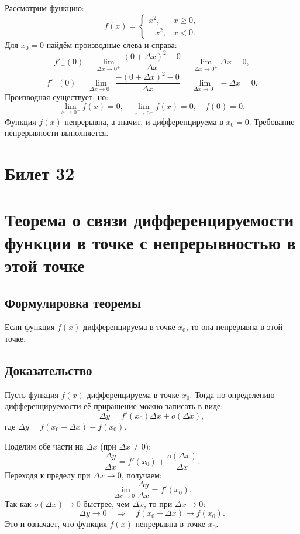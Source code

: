 \documentclass{article}
\begin{document}
Рассмотрим функцию:
\[
f(x) = 
\begin{cases} 
x^2, & x \geq 0, \\ 
-x^2, & x < 0.
\end{cases}
\]
Для \( x_0 = 0 \) найдём производные слева и справа:
\[
f'_+(0) = \lim_{\Delta x \to 0^+} \frac{(0 + \Delta x)^2 - 0}{\Delta x} = \lim_{\Delta x \to 0^+} \Delta x = 0,
\]
\[
f'_-(0) = \lim_{\Delta x \to 0^-} \frac{-(0 + \Delta x)^2 - 0}{\Delta x} = \lim_{\Delta x \to 0^-} -\Delta x = 0.
\]
Производная существует, но:
\[
\lim_{x \to 0^-} f(x) = 0, \quad \lim_{x \to 0^+} f(x) = 0, \quad f(0) = 0.
\]
Функция \( f(x) \) непрерывна, а значит, и дифференцируема в \( x_0 = 0 \). Требование непрерывности выполняется.

\section{Билет 32}

\section*{Теорема о связи дифференцируемости функции в точке с непрерывностью в этой точке}

\subsection{Формулировка теоремы}
Если функция \( f(x) \) дифференцируема в точке \( x_0 \), то она непрерывна в этой точке.

\subsection{Доказательство}
Пусть функция \( f(x) \) дифференцируема в точке \( x_0 \). Тогда по определению дифференцируемости её приращение можно записать в виде:
\[
\Delta y = f'(x_0) \Delta x + o(\Delta x),
\]
где \( \Delta y = f(x_0 + \Delta x) - f(x_0) \).

Поделим обе части на \( \Delta x \) (при \( \Delta x \neq 0 \)):
\[
\frac{\Delta y}{\Delta x} = f'(x_0) + \frac{o(\Delta x)}{\Delta x}.
\]
Переходя к пределу при \( \Delta x \to 0 \), получаем:
\[
\lim_{\Delta x \to 0} \frac{\Delta y}{\Delta x} = f'(x_0).
\]
Так как \( o(\Delta x) \to 0 \) быстрее, чем \( \Delta x \), то при \( \Delta x \to 0 \):
\[
\Delta y \to 0 \quad \Rightarrow \quad f(x_0 + \Delta x) \to f(x_0).
\]
Это и означает, что функция \( f(x) \) непрерывна в точке \( x_0 \).
\end{document}
